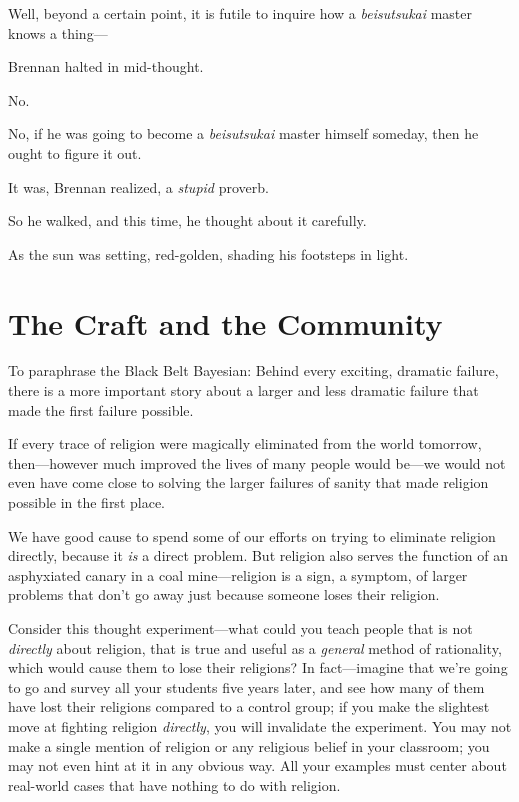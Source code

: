 {
 Well, beyond a certain point, it is futile to inquire how a
\textit{beisutsukai} master knows a thing---}

{
 Brennan halted in mid-thought.}

{
 No.}

{
 No, if he was going to become a \textit{beisutsukai} master
himself someday, then he ought to figure it out.}

{
 It was, Brennan realized, a \textit{stupid} proverb.}

{
 So he walked, and this time, he thought about it carefully.}

{
 As the sun was setting, red-golden, shading his footsteps in
light.}

\myendsectiontext

\chapter{The Craft and the Community}


{
 To paraphrase the Black Belt Bayesian: Behind every exciting,
dramatic failure, there is a more important story about a larger and
less dramatic failure that made the first failure possible. }

{
 If every trace of religion were magically eliminated from the
world tomorrow, then---however much improved the lives of many people
would be---we would not even have come close to solving the larger
failures of sanity that made religion possible in the first place.}

{
 We have good cause to spend some of our efforts on trying to
eliminate religion directly, because it \textit{is} a direct problem.
But religion also serves the function of an asphyxiated canary in a
coal mine---religion is a sign, a symptom, of larger problems that
don't go away just because someone loses their
religion.}

{
 Consider this thought experiment---what could you teach people
that is not \textit{directly} about religion, that is true and useful
as a \textit{general} method of rationality, which would cause them to
lose their religions? In fact---imagine that we're
going to go and survey all your students five years later, and see how
many of them have lost their religions compared to a control group; if
you make the slightest move at fighting religion \textit{directly}, you
will invalidate the experiment. You may not make a single mention of
religion or any religious belief in your classroom; you may not even
hint at it in any obvious way. All your examples must center about
real-world cases that have nothing to do with religion.}

